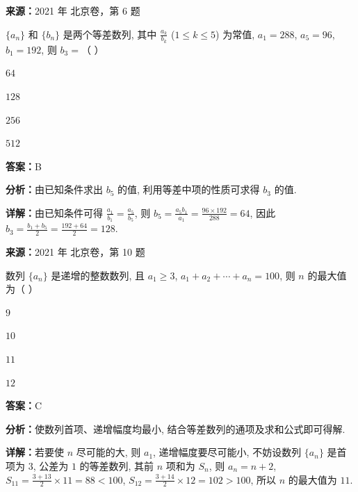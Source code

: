 \begin{question}[points=4]
\textbf{来源：}2021 年 北京卷，第 6 题\par
$\{a_n\}$ 和 $\{b_n\}$ 是两个等差数列, 其中 $\frac{a_k}{b_k}$ ($1\leq k\leq 5$) 为常值, $a_1=288$, $a_5=96$, $b_1=192$, 则 $b_3=$（ ）
\begin{choices}
  \item $64$
  \item $128$
  \item $256$
  \item $512$
\end{choices}
\begin{solution}
\textbf{答案：}B

\textbf{分析：}由已知条件求出 $b_5$ 的值, 利用等差中项的性质可求得 $b_3$ 的值.

\textbf{详解：}由已知条件可得 $\frac{a_1}{b_1}=\frac{a_5}{b_5}$, 则 $b_5=\frac{a_5 b_1}{a_1}=\frac{96\times192}{288}=64$, 因此 $b_3=\frac{b_1+b_5}{2}=\frac{192+64}{2}=128$.
\end{solution}
\end{question}

\begin{question}[points=4]
\textbf{来源：}2021 年 北京卷，第 10 题\par
数列 $\{a_n\}$ 是递增的整数数列, 且 $a_1\geq 3$, $a_1+a_2+\cdots+a_n=100$, 则 $n$ 的最大值为（ ）
\begin{choices}
  \item $9$
  \item $10$
  \item $11$
  \item $12$
\end{choices}
\begin{solution}
\textbf{答案：}C

\textbf{分析：}使数列首项、递增幅度均最小, 结合等差数列的通项及求和公式即可得解.

\textbf{详解：}若要使 $n$ 尽可能的大, 则 $a_1$, 递增幅度要尽可能小, 不妨设数列 $\{a_n\}$ 是首项为 $3$, 公差为 $1$ 的等差数列, 其前 $n$ 项和为 $S_n$, 则 $a_n=n+2$, $S_{11}=\frac{3+13}{2}\times 11=88<100$, $S_{12}=\frac{3+14}{2}\times 12=102>100$, 所以 $n$ 的最大值为 $11$.
\end{solution}
\end{question}

